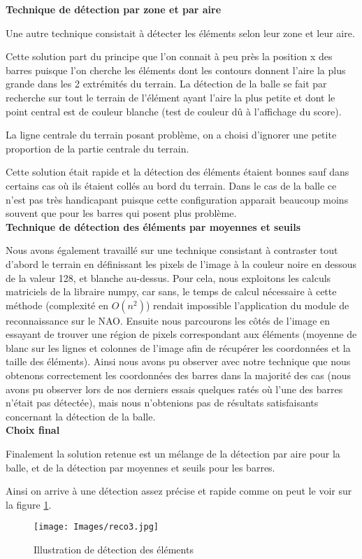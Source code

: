   \textbf{Technique de détection par zone et par aire}
    \par Une autre technique consistait à détecter les éléments selon leur zone et leur aire.
    \par Cette solution part du principe que l'on connait à peu près la position x des barres puisque l'on cherche les éléments dont les contours donnent l'aire la plus grande dans les 2 extrémités du terrain.
    La détection de la balle se fait par recherche sur tout le terrain de l'élément ayant l'aire la plus petite et dont le point central est de couleur blanche (test de couleur dû à l'affichage du score).
    \par La ligne centrale du terrain posant problème, on a choisi d'ignorer une petite proportion de la partie centrale du terrain.
    \par Cette solution était rapide et la détection des éléments étaient bonnes sauf dans certains cas où ils étaient collés au bord du terrain.
    Dans le cas de la balle ce n'est pas très handicapant puisque cette configuration apparait beaucoup moins souvent que pour les barres qui posent plus problème.\\

  \textbf{Technique de détection des éléments par moyennes et seuils}
    \par Nous avons également travaillé sur une technique consistant à contraster tout d'abord le terrain en définissant les pixels de l'image à la couleur noire en dessous de la valeur 128, et blanche au-dessus.
    Pour cela, nous exploitons les calculs matriciels de la libraire numpy, car sans, le temps de calcul nécessaire à cette méthode (complexité en $O(n^2)$) rendait impossible l’application du module de reconnaissance sur le NAO.
    Ensuite nous parcourons les côtés de l'image en essayant de trouver une région de pixels correspondant aux éléments (moyenne de blanc sur les lignes et colonnes de l'image afin de récupérer les coordonnées et la taille des éléments).
    Ainsi nous avons pu observer avec notre technique que nous obtenons correctement les coordonnées des barres dans la majorité des cas (nous avons pu observer lors de nos derniers essais quelques ratés où l'une des barres n'était pas détectée), mais nous n'obtenions pas de résultats satisfaisants concernant la détection de la balle.\\

  \textbf{Choix final}
    \par Finalement la solution retenue est un mélange de la détection par aire pour la balle, et de la détection par moyennes et seuils pour les barres.
    \par Ainsi on arrive à une détection assez précise et rapide comme on peut le voir sur la figure \ref{fig:reco3}.

    \begin{figure}[h]
      \caption{Illustration de détection des éléments}
      \label{fig:reco3}
      \centering
      \texttt{[image: Images/reco3.jpg]}
    \end{figure}
